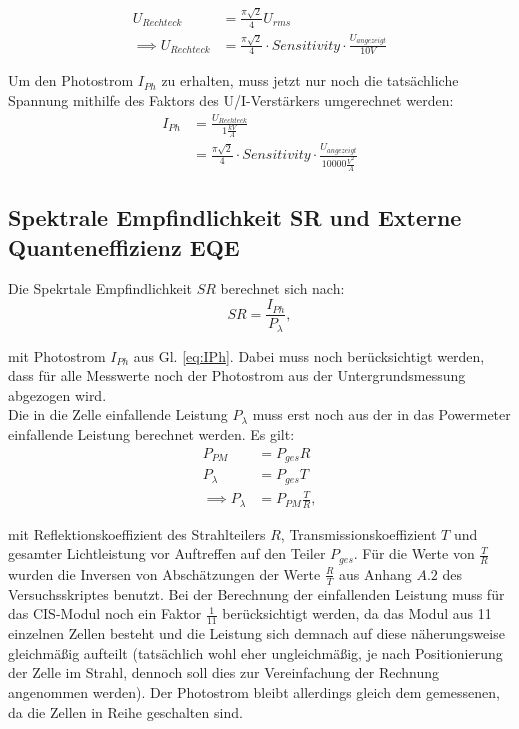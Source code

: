 \begin{align}
U_{Rechteck} &= \frac{\pi \sqrt{2}}{4} U_{rms} \\
\implies U_{Rechteck} &= \frac{\pi \sqrt{2}}{4} \cdot Sensitivity \cdot \frac{U_{angezeigt}}{10V}
\end{align}

Um den Photostrom $I_{Ph}$ zu erhalten, muss jetzt nur noch die tatsächliche Spannung mithilfe des Faktors des U/I-Verstärkers umgerechnet werden:\\

\begin{align}
I_{Ph} &= \frac{U_{Rechteck}}{1 \frac{kV}{A}} \nonumber \\
 &= \frac{\pi \sqrt{2}}{4} \cdot Sensitivity \cdot \frac{U_{angezeigt}}{10000 \frac{V^2}{A}}
\label{eq:IPh}
\end{align}


\subsection{Spektrale Empfindlichkeit SR und Externe Quanteneffizienz EQE}

Die Spekrtale Empfindlichkeit $SR$ berechnet sich nach:
\begin{equation}
SR = \frac{I_{Ph}}{P_\lambda},
\end{equation}

mit Photostrom $I_{Ph}$ aus Gl. \ref{eq:IPh}. Dabei muss noch berücksichtigt werden, dass für alle Messwerte noch der Photostrom aus der
Untergrundsmessung abgezogen wird. \\
Die in die Zelle einfallende Leistung $P_{\lambda}$ muss erst noch aus der in das Powermeter einfallende Leistung berechnet werden. Es gilt:
\begin{align}
P_{PM} &= P_{ges} R \nonumber \\
P_{\lambda} &= P_{ges} T \nonumber \\
\implies P_{\lambda} &= P_{PM} \frac{T}{R},
\end{align}

mit Reflektionskoeffizient des Strahlteilers $R$, Transmissionskoeffizient $T$ und gesamter Lichtleistung vor Auftreffen auf den Teiler $P_{ges}$.
Für die Werte von $\frac{T}{R}$ wurden die Inversen von Abschätzungen der Werte $\frac{R}{T}$ aus Anhang $A.2$ des Versuchsskriptes benutzt. Bei der 
Berechnung der einfallenden Leistung muss für das CIS-Modul noch ein Faktor $\frac{1}{11}$ berücksichtigt werden, da das Modul aus 11 
einzelnen Zellen besteht und die Leistung sich demnach auf diese näherungsweise gleichmäßig aufteilt (tatsächlich wohl eher ungleichmäßig, 
je nach Positionierung der Zelle im Strahl, dennoch soll dies zur Vereinfachung der Rechnung angenommen werden). Der Photostrom bleibt 
allerdings gleich dem gemessenen, da die Zellen in Reihe geschalten sind.

